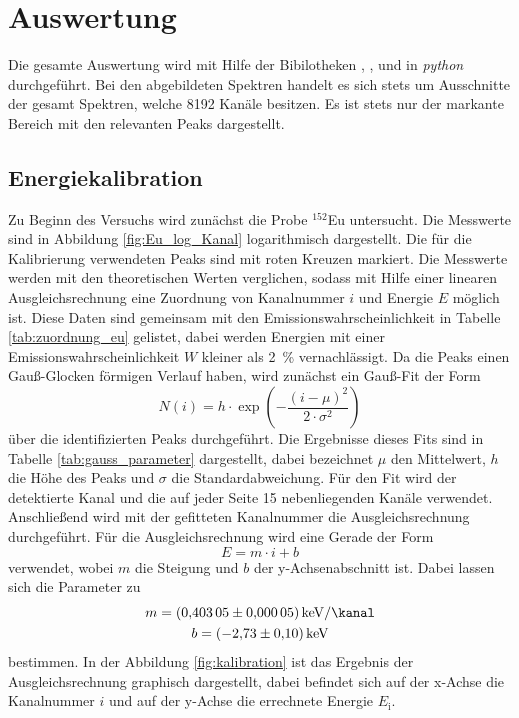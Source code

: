 \newpage
\section{Auswertung}
\label{sec:Auswertung}
Die gesamte Auswertung wird mit Hilfe der Bibilotheken \cite{matplotlib}, \cite{numpy}, \cite{scipy} und
\cite{uncertainties} in \textit{python} durchgeführt. Bei den abgebildeten Spektren handelt es sich stets um 
Ausschnitte der gesamt Spektren, welche \num{8192} Kanäle besitzen. Es ist stets nur der markante Bereich
mit den relevanten Peaks dargestellt.


\subsection{Energiekalibration}
\label{sec:Energiekalibration}
Zu Beginn des Versuchs wird zunächst die Probe ${}^{152}$Eu untersucht. Die Messwerte
sind in Abbildung \ref{fig:Eu_log_Kanal} logarithmisch dargestellt.
Die für die Kalibrierung verwendeten Peaks sind mit roten Kreuzen markiert. Die Messwerte
werden mit den theoretischen Werten \cite{referenz1} verglichen, sodass mit Hilfe einer linearen Ausgleichsrechnung
eine Zuordnung von Kanalnummer $i$ und Energie $E$ möglich ist. Diese Daten sind
gemeinsam mit den Emissionswahrscheinlichkeit in Tabelle \ref{tab:zuordnung_eu}
gelistet, dabei werden Energien mit einer Emissionswahrscheinlichkeit $W$
kleiner als \SI{2}{\percent} vernachlässigt.
Da die Peaks einen Gauß-Glocken förmigen Verlauf haben, wird zunächst ein Gauß-Fit der Form
\begin{equation}
  N(i) = h \cdot \exp{\left(-\frac{\left(i - \mu\right)^2}{2\cdot \sigma^2}\right)}
\end{equation}
über die identifizierten Peaks durchgeführt. Die Ergebnisse dieses Fits sind in Tabelle \ref{tab:gauss_parameter}
dargestellt, dabei bezeichnet $\mu$ den Mittelwert, $h$ die Höhe des Peaks und $\sigma$ die Standardabweichung.
Für den Fit wird der detektierte Kanal und die auf jeder Seite 
\num{15} nebenliegenden Kanäle verwendet. Anschließend wird mit der gefitteten Kanalnummer die Ausgleichsrechnung
durchgeführt. Für die Ausgleichsrechnung wird eine Gerade der Form
\begin{equation}
  E = m \cdot i + b
\end{equation}
verwendet, wobei $m$ die Steigung und $b$ der y-Achsenabschnitt ist. Dabei lassen sich die Parameter zu
\begin{gather*}
  m = \SI{0.40305(5)}{\kilo\electronvolt\per\kanal} \\
  b = \SI{-2.73(10)}{\kilo\electronvolt}
\end{gather*}
bestimmen.
In der Abbildung \ref{fig:kalibration} ist das Ergebnis der Ausgleichsrechnung graphisch
dargestellt, dabei befindet sich auf der x-Achse die Kanalnummer $i$ und auf der
y-Achse die errechnete Energie $E_\text{i}$.


